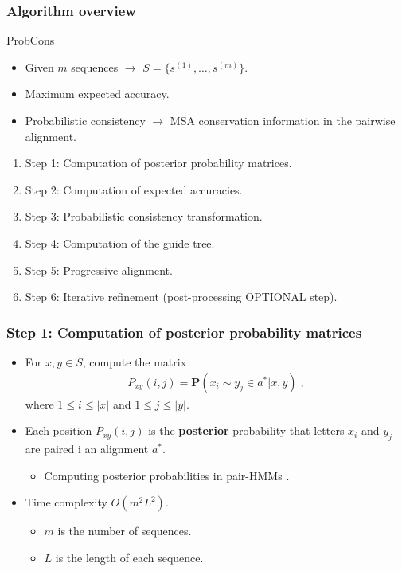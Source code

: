 \begin{frame}
    \frametitle{Algorithm overview}

    \begin{block}{ProbCons \cite{do2005probcons}}
        \begin{itemize}
            \item Given $m$ sequences $\rightarrow$ $S = \{s^{(1)}, \ldots, s^{(m)} \}$.
            \item Maximum expected accuracy.
            \item Probabilistic consistency $\rightarrow$ MSA conservation information in the pairwise alignment.
        \end{itemize}
    \end{block}
    
    \begin{enumerate}
        \item Step 1: Computation of posterior probability matrices.
        \item Step 2: Computation of expected accuracies.
        \item Step 3: Probabilistic consistency transformation.
        \item Step 4: Computation of the guide tree.
        \item Step 5: Progressive alignment.
        \item Step 6: Iterative refinement (post-processing OPTIONAL step).
    \end{enumerate}
\end{frame}

\begin{frame}
    \frametitle{Step 1: Computation of posterior probability matrices}
    \begin{itemize}
        \item For $x, y \in S$, compute the matrix
        \begin{align*}
            P_{xy}(i,j) = \pmb{P}(x_i \sim y_j \in a^* | x, y) \;,
        \end{align*}
        where $1\leq i\leq|x|$ and $1\leq j\leq |y|$.
        \item Each position $P_{xy}(i,j)$ is the \textbf{posterior} probability that letters $x_i$ and $y_j$ are paired i an alignment $a^*$.
        \begin{itemize}
            \item Computing posterior probabilities in pair-HMMs \cite{durbin1998biological}.
        \end{itemize}
        \item Time complexity $O(m^2 L^2)$.
        \begin{itemize}
            \item $m$ is the number of sequences.
            \item $L$ is the length of each sequence.
        \end{itemize}
    \end{itemize}
\end{frame}

